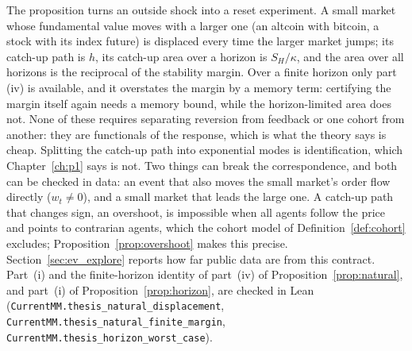 The proposition turns an outside shock into a reset experiment. A small market whose fundamental value moves with a larger one (an altcoin with bitcoin, a stock with its index future) is displaced every time the larger market jumps; its catch-up path is $h$, its catch-up area over a horizon is $S_H/\kappa$, and the area over all horizons is the reciprocal of the stability margin. Over a finite horizon only part (iv) is available, and it overstates the margin by a memory term: certifying the margin itself again needs a memory bound, while the horizon-limited area does not. None of these requires separating reversion from feedback or one cohort from another: they are functionals of the response, which is what the theory says is cheap. Splitting the catch-up path into exponential modes is identification, which Chapter~\ref{ch:p1} says is not. Two things can break the correspondence, and both can be checked in data: an event that also moves the small market's order flow directly ($w_t\neq0$), and a small market that leads the large one. A catch-up path that changes sign, an overshoot, is impossible when all agents follow the price and points to contrarian agents, which the cohort model of Definition~\ref{def:cohort} excludes; Proposition~\ref{prop:overshoot} makes this precise. Section~\ref{sec:ev_explore} reports how far public data are from this contract. Part~(i) and the finite-horizon identity of part~(iv) of Proposition~\ref{prop:natural}, and part~(i) of Proposition~\ref{prop:horizon}, are checked in Lean (\nolinkurl{CurrentMM.thesis_natural_displacement}, \nolinkurl{CurrentMM.thesis_natural_finite_margin}, \nolinkurl{CurrentMM.thesis_horizon_worst_case}).

